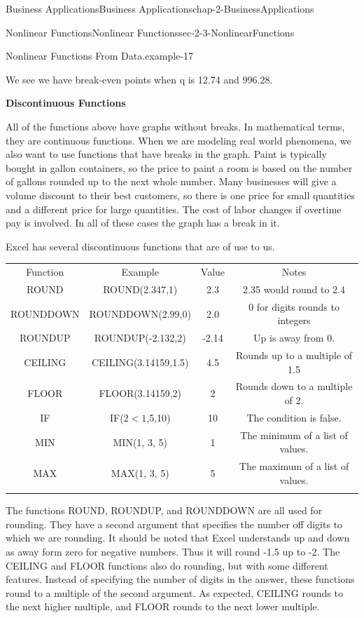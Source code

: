 \documentclass[oneside,10pt,]{book}
\newcommand{\terminology}[1]{\textbf{#1}}
\numberwithin{equation}{section}
\newcommand{\hrulethin}  {\noalign{\hrule height 0.04em}}
\newcommand{\hrulethick} {\noalign{\hrule height 0.11em}}
\newcommand{\lt}{<}
\begin{document}
\begin{chapterptx}{Business Applications}{}{Business Applications}{}{}{chap-2-BusinessApplications}
\begin{sectionptx}{Nonlinear Functions}{}{Nonlinear Functions}{}{}{sec-2-3-NonlinearFunctions}
\begin{example}{Nonlinear Functions From Data.}{example-17}
\begin{sidebyside}{1}{0.1}{0.1}{0}
\begin{sbspanel}{0.8}
\end{sbspanel}%
\end{sidebyside}%
\par
\hypertarget{p-780}{}%
We see we have break-even points when q is 12.74 and 996.28.%
\end{example}
\hypertarget{p-781}{}%
\terminology{Discontinuous Functions}%
\par
\hypertarget{p-782}{}%
All of the functions above have graphs without breaks.  In mathematical terms, they are continuous functions.  When we are modeling real world phenomena, we also want to use functions that have breaks in the graph.  Paint is typically bought in gallon containers, so the price to paint a room is based on the number of gallons rounded up to the next whole number.  Many businesses will give a volume discount to their best customers, so there is one price for small quantities and a different price for large quantities.  The cost of labor changes if overtime pay is involved.  In all of these cases the graph has a break in it.%
\par
\hypertarget{p-783}{}%
Excel has several discontinuous functions that are of use to us.%
\begin{sidebyside}{1}{0}{0}{0}%
\begin{sbspanel}{1}%
{\centering%
\begin{tabular}{cccc}\hrulethick
Function&Example&Value&Notes\tabularnewline\hrulethin
ROUND&ROUND(2.347,1)&2.3&2.35 would round to 2.4\tabularnewline\hrulethin
ROUNDDOWN&ROUNDDOWN(2.99,0)&2.0&0 for digits rounds to integers\tabularnewline\hrulethin
ROUNDUP&ROUNDUP(-2.132,2)&-2.14&Up is away from 0.\tabularnewline\hrulethin
CEILING&CEILING(3.14159,1.5)&4.5&Rounds up to a multiple of 1.5\tabularnewline\hrulethin
FLOOR&FLOOR(3.14159,2)&2&Rounds down to a multiple of 2.\tabularnewline\hrulethin
IF&IF(\(2 \lt 1\),5,10)&10&The condition is false.\tabularnewline\hrulethin
MIN&MIN(1, 3, 5)&1&The minimum of a list of values.\tabularnewline\hrulethin
MAX&MAX(1, 3, 5)&5&The maximum of a list of values.\tabularnewline\hrulethin
\end{tabular}
\par}
\end{sbspanel}%
\end{sidebyside}%
\par
\hypertarget{p-784}{}%
The functions ROUND, ROUNDUP, and ROUNDDOWN are all used for rounding.  They have a second argument that specifies the number off digits to which we are rounding.  It should be noted that Excel understands up and down as away form zero for negative numbers.  Thus it will round -1.5 up to -2. The CEILING and FLOOR functions also do rounding, but with some different features.  Instead of specifying the number of digits in the answer, these functions round to a multiple of the second argument.  As expected, CEILING rounds to the next higher multiple, and FLOOR rounds to the next lower multiple.%

\end{sectionptx}
\end{chapterptx}
\end{document}
